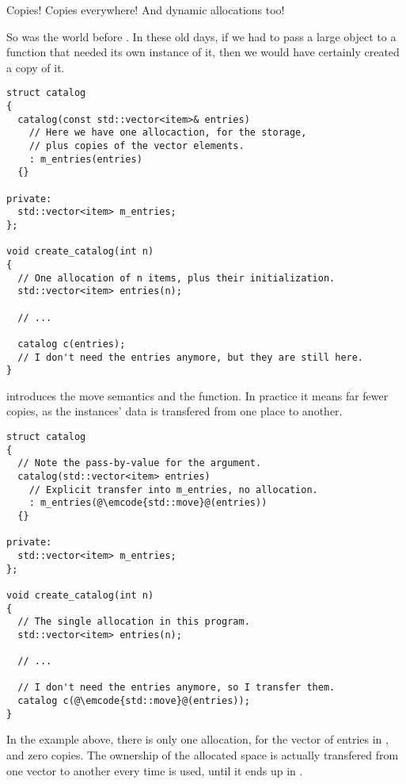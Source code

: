 \label{move}

Copies! Copies everywhere! And dynamic allocations too!

So was the world before . In these old days, if we had to pass
a large object to a function that needed its own instance of it, then
we would have certainly created a copy of it.

\begin{lstlisting}
struct catalog
{
  catalog(const std::vector<item>& entries)
    // Here we have one allocaction, for the storage,
    // plus copies of the vector elements.
    : m_entries(entries)
  {}

private:
  std::vector<item> m_entries;
};

void create_catalog(int n)
{
  // One allocation of n items, plus their initialization.
  std::vector<item> entries(n);

  // ...

  catalog c(entries);
  // I don't need the entries anymore, but they are still here.
}
\end{lstlisting}

%
%
 introduces the move semantics and the 
function. In practice it means far fewer copies, as the instances'
data is transfered from one place to another.

\begin{lstlisting}
struct catalog
{
  // Note the pass-by-value for the argument.
  catalog(std::vector<item> entries)
    // Explicit transfer into m_entries, no allocation.
    : m_entries(@\emcode{std::move}@(entries))
  {}

private:
  std::vector<item> m_entries;
};

void create_catalog(int n)
{
  // The single allocation in this program.
  std::vector<item> entries(n);

  // ...

  // I don't need the entries anymore, so I transfer them.
  catalog c(@\emcode{std::move}@(entries));
}
\end{lstlisting}

In the example above, there is only one allocation, for the vector of
entries in , and zero copies. The ownership of
the allocated space is actually transfered from one vector to another
every time  is used, until it ends up
in .

